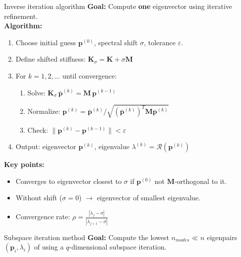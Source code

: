 \documentclass[aspectratio=169]{beamer}
\begin{document}
{  \begin{frame}{Inverse iteration algorithm}
    \small
    \textbf{Goal:} Compute \textbf{one} eigenvector using iterative refinement. \\[2mm]

    \textbf{Algorithm:}
    \begin{enumerate}
      \item Choose initial guess \(\mathbf p^{(0)}\), spectral shift \(\sigma\), tolerance \(\varepsilon\).
      \item Define shifted stiffness: \(\mathbf K_\sigma = \mathbf K + \sigma \mathbf M\)
      \item For \(k = 1,2,\dots\) until convergence:
            \begin{enumerate}
              \item Solve: \(\mathbf K_\sigma \, \bar{\mathbf p}^{(k)} = \mathbf M \, \mathbf p^{(k-1)}\)
              \item Normalize: \(\mathbf p^{(k)} = \bar{\mathbf p}^{(k)} / \sqrt{(\bar{\mathbf p}^{(k)})^T \mathbf M \bar{\mathbf p}^{(k)}}\)
              \item Check: \(\|\mathbf p^{(k)} - \mathbf p^{(k-1)}\| < \varepsilon\)
            \end{enumerate}
      \item Output: eigenvector \(\mathbf p^{(k)}\), eigenvalue \(\lambda^{(k)} = \mathcal R(\mathbf p^{(k)})\)
    \end{enumerate}

    \vspace{2mm}
    \textbf{Key points:}
    \begin{itemize}
      \item Converges to eigenvector closest to \(\sigma\) if \(\mathbf p^{(0)}\) not \(\mathbf M\)-orthogonal to it.
      \item Without shift (\(\sigma=0\)) $\to$ eigenvector of smallest eigenvalue.
      \item Convergence rate: \(\rho = \frac{|\lambda_j - \sigma|}{|\lambda_{j+1}-\sigma|}\)
    \end{itemize}
  \end{frame}

  \begin{frame}{Subspace iteration method}
    \small
    \textbf{Goal:} Compute the lowest \(n_{modes} \ll n\) eigenpairs \((\mathbf p_i, \lambda_i)\) of using a \(q\)-dimensional subspace iteration.\\[1mm]


\end{frame}}
\end{document}
